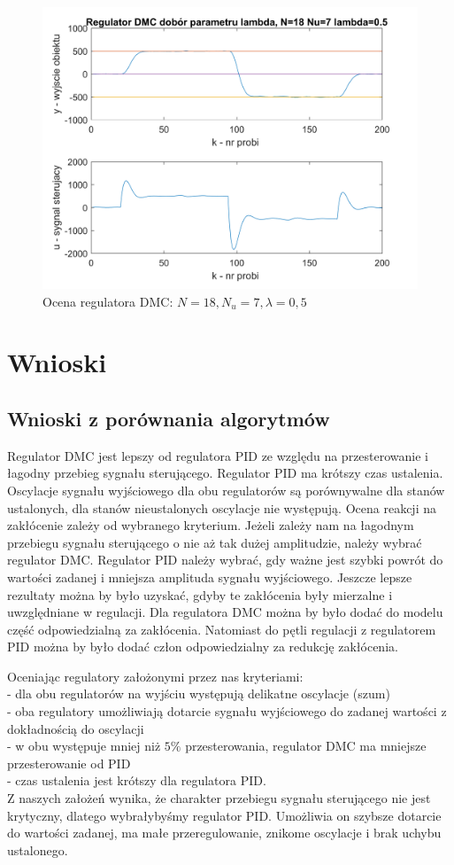 \documentclass[a4paper, 10pt]{article}
\begin{document}
\begin{figure}[H]
	\centering
	\includegraphics[width=0.9\linewidth]{DMC18750000000}
	\caption{Ocena regulatora DMC: $N=18, N_{u}=7, \lambda=0,5$}
	\label{fig:DMC18750000000_}
\end{figure}

\section{Wnioski}
\subsection{Wnioski z porównania algorytmów}
Regulator DMC jest lepszy od regulatora PID ze względu na przesterowanie i łagodny przebieg sygnału sterującego. Regulator PID ma krótszy czas ustalenia. Oscylacje sygnału wyjściowego dla obu regulatorów są porównywalne dla stanów ustalonych, dla stanów nieustalonych oscylacje nie występują. Ocena reakcji na zakłócenie zależy od wybranego kryterium. Jeżeli zależy nam na łagodnym przebiegu sygnału sterującego o nie aż tak dużej amplitudzie, należy wybrać regulator DMC. Regulator PID należy wybrać, gdy ważne jest szybki powrót do wartości zadanej i mniejsza amplituda sygnału wyjściowego. Jeszcze lepsze rezultaty można by było uzyskać, gdyby te zakłócenia były mierzalne i uwzględniane w regulacji. Dla regulatora DMC można by było dodać do modelu część odpowiedzialną za zakłócenia. Natomiast do pętli regulacji z regulatorem PID można by było dodać człon odpowiedzialny za redukcję zakłócenia. 

Oceniając regulatory założonymi przez nas kryteriami: \\
- dla obu regulatorów na wyjściu występują delikatne oscylacje (szum) \\
- oba regulatory umożliwiają dotarcie sygnału wyjściowego do zadanej wartości z dokładnością do oscylacji \\
- w obu występuje mniej niż $5\%$ przesterowania, regulator DMC ma mniejsze przesterowanie od PID \\
- czas ustalenia jest krótszy dla regulatora PID.\\
Z naszych założeń wynika, że charakter przebiegu sygnału sterującego nie jest krytyczny, dlatego wybrałybyśmy regulator PID. Umożliwia on szybsze dotarcie do wartości zadanej, ma małe przeregulowanie, znikome oscylacje i  brak uchybu ustalonego.
\end{document}

